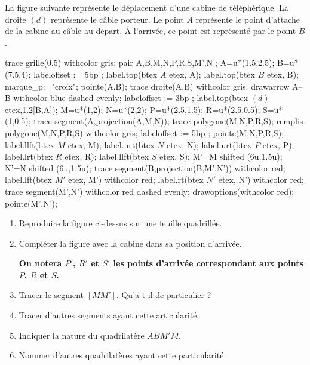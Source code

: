 \begin{activite}[La cabine]    
    La figure suivante représente le déplacement d'une cabine de téléphérique. La droite $(d)$ représente le câble porteur.
    Le point $A$ représente le point d'attache de la cabine au câble au départ. À l'arrivée, ce point est représenté par le point $B$.

    \begin{center}
        \begin{Geometrie}[CoinHD={(11u,5u)}]
            trace grille(0.5) withcolor gris;
            pair A,B,M,N,P,R,S,M',N';
            A=u*(1.5,2.5);
            B=u*(7.5,4);
            labeloffset := 5bp ;
            label.top(btex $A$ etex, A);
            label.top(btex $B$ etex, B);
            marque_p:="croix";
            pointe(A,B);
            trace droite(A,B) withcolor gris;
            drawarrow A--B withcolor blue dashed evenly;
            labeloffset := 3bp ;
            label.top(btex $(d)$ etex,1.2[B,A]);
            M=u*(1,2);
            N=u*(2,2);
            P=u*(2.5,1.5);
            R=u*(2.5,0.5);
            S=u*(1,0.5);
            trace segment(A,projection(A,M,N));
            trace polygone(M,N,P,R,S);
            remplis polygone(M,N,P,R,S) withcolor gris;
            labeloffset := 5bp ;
            pointe(M,N,P,R,S);
            label.llft(btex  $M$ etex, M);
            label.urt(btex  $N$ etex, N);
            label.urt(btex  $P$ etex, P);
            label.lrt(btex  $R$ etex, R);
            label.llft(btex $S$ etex, S);
            M'=M shifted (6u,1.5u);
            N'=N shifted (6u,1.5u);
            trace segment(B,projection(B,M',N')) withcolor red;
            label.lft(btex $M'$ etex, M') withcolor red;
            label.rt(btex $N'$ etex, N') withcolor red;
            trace segment(M',N') withcolor red dashed evenly;
            drawoptions(withcolor red);        
            pointe(M',N');
        \end{Geometrie}
    \end{center}
        \begin{enumerate}
        \item Reproduire la figure ci-dessus sur une feuille quadrillée.
        \item Compléter la figure avec la cabine dans sa position d'arrivée.
        
        \smallskip
        {\bfseries On notera $P'$, $R'$ et $S'$ les points d'arrivée correspondant aux points $P$, $R$ et $S$.}
        \smallskip
        \item Tracer le segment $[MM']$. Qu'a-t-il de particulier ?
        \item Tracer d'autres segments ayant cette articularité.
        \item Indiquer la nature du quadrilatère $ABM'M$.
        \item Nommer d'autres quadrilatères ayant cette particularité.
        

\end{enumerate}
\end{activite}
